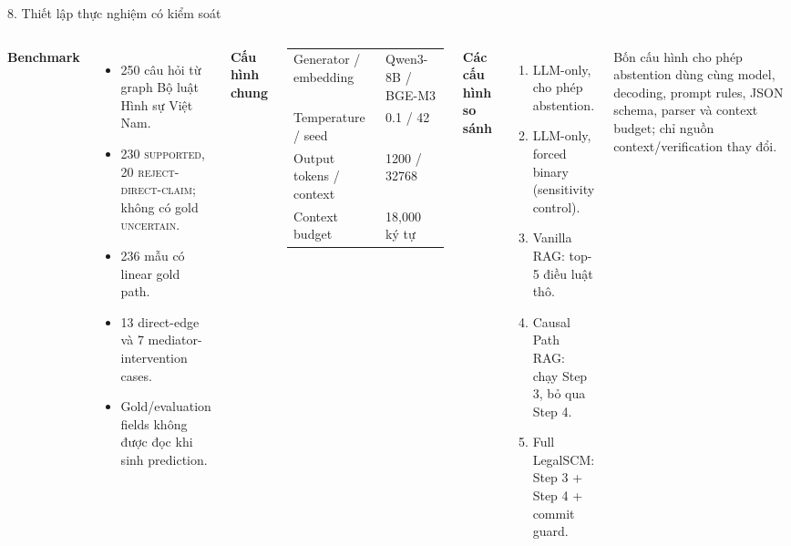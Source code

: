 \documentclass[aspectratio=169,10pt]{beamer}
\begin{document}
\begin{frame}{8. Thiết lập thực nghiệm có kiểm soát}
\begin{columns}[T,onlytextwidth]
\textbf{Benchmark}
\begin{itemize}\small
  \item 250 câu hỏi từ graph Bộ luật Hình sự Việt Nam.
  \item 230 \textsc{supported}, 20 \textsc{reject-direct-claim}; không có gold \textsc{uncertain}.
  \item 236 mẫu có linear gold path.
  \item 13 direct-edge và 7 mediator-intervention cases.
  \item Gold/evaluation fields không được đọc khi sinh prediction.
\end{itemize}

\medskip
\textbf{Cấu hình chung}
\begin{tabular}{ll}
\toprule
Generator / embedding & Qwen3-8B / BGE-M3\\
Temperature / seed & 0.1 / 42\\
Output tokens / context & 1200 / 32768\\
Context budget & 18{,}000 ký tự\\
\bottomrule
\end{tabular}

\textbf{Các cấu hình so sánh}
\begin{enumerate}\small
  \item LLM-only, cho phép abstention.
  \item LLM-only, forced binary (sensitivity control).
  \item Vanilla RAG: top-5 điều luật thô.
  \item Causal Path RAG: chạy Step 3, bỏ qua Step 4.
  \item Full LegalSCM: Step 3 + Step 4 + commit guard.
\end{enumerate}

\medskip
{\small Bốn cấu hình cho phép abstention dùng cùng model, decoding, prompt rules, JSON schema, parser và context budget; chỉ nguồn context/verification thay đổi.}
\end{columns}
\end{frame}
\end{document}
